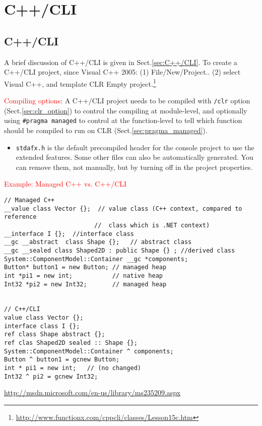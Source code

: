 \chapter{C++/CLI}

\section{C++/CLI}
\label{sec:VC++_C++/CLI}

A brief discussion of C++/CLI is given in Sect.\ref{sec:C++/CLI}.
To create a C++/CLI project, since Visual C++ 2005: (1) File/New/Project.. (2)
select Visual C++, and template CLR Empty
project.\footnote{\url{http://www.functionx.com/cppcli/classes/Lesson15c.htm}} 

\textcolor{red}{Compiling options}: A C++/CLI project needs to be compiled with
\verb!/clr! option (Sect.\ref{sec:clr_option}) to control the compiling at
module-level, and optionally using \verb!#pragma managed! to control at the
function-level to tell which function should be compiled to run on CLR
(Sect.\ref{sec:pragma_managed}).
\begin{itemize}
  \item  \verb!stdafx.h! is the default precompiled header for the console project to use
the extended features. Some other files can also be automatically generated. You
can remove them, not manually, but by turning off in the project properties.
  
\end{itemize}


\textcolor{red}{Example: Managed C++ vs. C++/CLI}
\begin{verbatim}
// Managed C++
__value class Vector {};  // value class (C++ context, compared to reference
                         //  class which is .NET context)
__interface I {};  //interface class
__gc __abstract  class Shape {};   // abstract class
__gc __sealed class Shaped2D : public Shape {} ; //derived class
System::ComponentModel::Container __gc *components;
Button* button1 = new Button; // managed heap
int *pi1 = new int;           // native heap
Int32 *pi2 = new Int32;       // managed heap


// C++/CLI
value class Vector {};
interface class I {};
ref class Shape abstract {};
ref clas Shaped2D sealed :: Shape {};
System::ComponentModel::Container ^ components;
Button ^ button1 = gcnew Button;
int * pi1 = new int;   // (no changed)
Int32 ^ pi2 = gcnew Int32; 
\end{verbatim}
\url{http://msdn.microsoft.com/en-us/library/ms235209.aspx}

